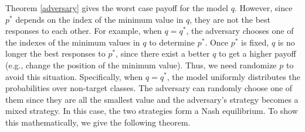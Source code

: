 \documentclass{article}
\theoremstyle{definition}
\begin{document}
Theorem \ref{adversary} gives the worst case payoff for the model $q$. However, since $p^*$ depends on the index of the minimum value in $q$, they are not the best responses to each other. For example, when $q=q^*$, the adversary chooses one of the indexes of the minimum values in $q$ to determine $p^*$. Once $p^*$ is fixed, $q$ is no longer the best responses to $p^*$, since there exist a better $q$ to get a higher payoff (e.g., change the position of the minimum value). Thus, we need randomize $p$ to avoid this situation. Specifically, when $q=q^*$, the model uniformly distributes the probabilities over non-target classes. The adversary can randomly choose one of them since they are all the smallest value and the adversary's strategy becomes a mixed strategy. In this case, the two strategies form a Nash equilibrium. To show this mathematically, we give the following theorem.
\end{document}
